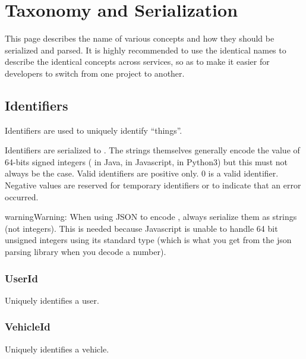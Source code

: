 \documentclass[letterpaper,10pt,english]{sphinxmanual}
\begin{document}
\chapter{Taxonomy and Serialization}
\label{\detokenize{taxonomy_serialization:taxonomy-and-serialization}}\label{\detokenize{taxonomy_serialization:taxonomy-serialization}}\label{\detokenize{taxonomy_serialization::doc}}
This page describes the name of various concepts and how they should be serialized and parsed.
It is highly recommended to use the identical names to describe the identical concepts across services, so as to make it easier for developers to switch from one project to another.


\section{Identifiers}
\label{\detokenize{taxonomy_serialization:identifier}}\label{\detokenize{taxonomy_serialization:identifiers}}
Identifiers are used to uniquely identify “things”.

Identifiers are serialized to .
The strings themselves generally encode the value of 64-bits signed integers ( in Java,  in Javascript,  in Python3) but this must not always be the case.
Valid identifiers are positive only.
0 is a valid identifier.
Negative values are reserved for temporary identifiers or to indicate that an error occurred.

\begin{sphinxadmonition}{warning}{Warning:}
When using JSON to encode {\hyperref[\detokenize{taxonomy_serialization:identifier}]{}}, always serialize them as strings (not integers).
This is needed because Javascript is unable to handle 64 bit unsigned integers using its standard  type (which is what you get from the json parsing library when you decode a number).
\end{sphinxadmonition}


\subsection{UserId}
\label{\detokenize{taxonomy_serialization:userid}}\label{\detokenize{taxonomy_serialization:user-id}}
Uniquely identifies a user.


\subsection{VehicleId}
\label{\detokenize{taxonomy_serialization:vehicleid}}\label{\detokenize{taxonomy_serialization:vehicle-id}}
Uniquely identifies a vehicle.
\end{document}

